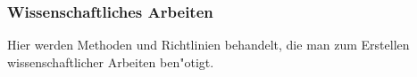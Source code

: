 \subsubsection{Wissenschaftliches Arbeiten}

Hier werden Methoden und Richtlinien behandelt, die man zum Erstellen
wissenschaftlicher Arbeiten ben"otigt.
